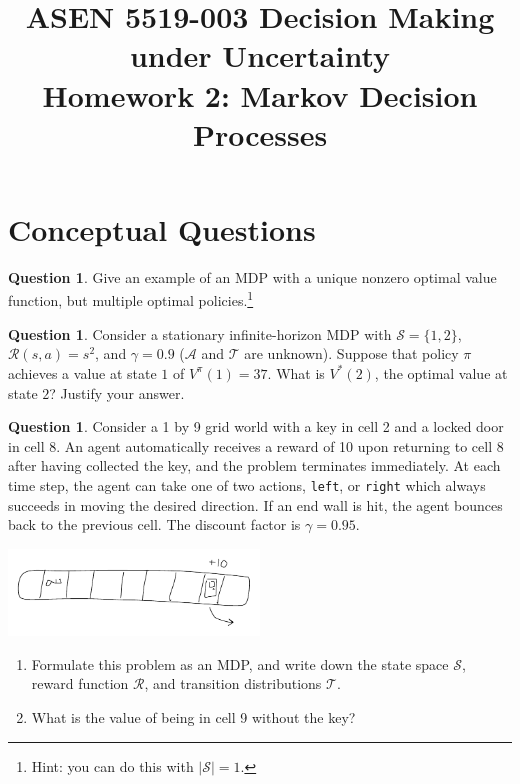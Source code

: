 \documentclass{article}
\title{ASEN 5519-003 Decision Making under Uncertainty\\
       Homework 2: Markov Decision Processes}
\theoremstyle{definition}
\newtheorem{question}[thm]{Question}
\begin{document}
\maketitle

\section{Conceptual Questions}

\begin{question}
    Give an example of an MDP with a unique nonzero optimal value function, but multiple optimal policies.\footnote{Hint: you can do this with $|\mathcal{S}| = 1$.}
\end{question}

\begin{question}
    Consider a stationary infinite-horizon MDP with $\mathcal{S} = \{1,2\}$, $\mathcal{R}(s, a) = s^2$, and $\gamma = 0.9$ ($\mathcal{A}$ and $\mathcal{T}$ are unknown). Suppose that policy $\pi$ achieves a value at state $1$ of $V^\pi(1) = 37$. What is $V^*(2)$, the optimal value at state $2$? Justify your answer.
\end{question}

\begin{question}
    Consider a 1 by 9 grid world with a key in cell 2 and a locked door in cell 8. An agent automatically receives a reward of 10 upon returning to cell 8 after having collected the key, and the problem terminates immediately. At each time step, the agent can take one of two actions, \texttt{left}, or \texttt{right} which always succeeds in moving the desired direction. If an end wall is hit, the agent bounces back to the previous cell. The discount factor is $\gamma=0.95$.
\begin{center}
    \includegraphics[width=0.5\textwidth]{small_mdp.pdf}
\end{center}

\begin{enumerate}[label=\alph*]
        \item Formulate this problem as an MDP, and write down the state space $\mathcal{S}$, reward function $\mathcal{R}$, and transition distributions $\mathcal{T}$.
        \item What is the value of being in cell 9 without the key?
    \end{enumerate}

\end{question}
\end{document}
